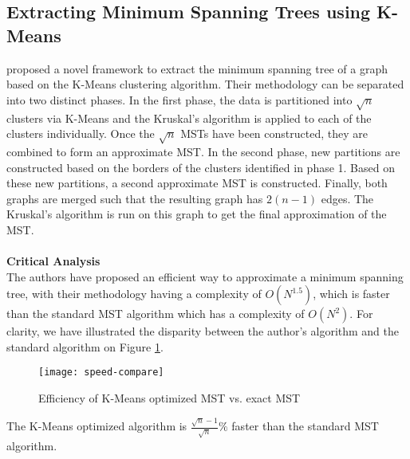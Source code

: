 \subsection{Extracting Minimum Spanning Trees using K-Means}
 proposed a novel framework to extract the minimum spanning tree of a graph based on the K-Means clustering algorithm. Their methodology can be separated into two distinct phases. In the first phase,  the data is partitioned into $\sqrt{n}$ clusters via K-Means and the Kruskal's algorithm is applied to each of the clusters individually.  Once the $\sqrt{n}$ MSTs have been constructed, they are combined to form an approximate MST. In the second phase,  new partitions are constructed based on the borders of the clusters identified in phase 1.  Based on these new partitions, a second approximate MST is constructed.  Finally, both graphs are merged such that the resulting graph has $2(n-1)$ edges. The Kruskal's algorithm is run on this graph to get the final approximation of the MST.
\\\\\textbf{Critical Analysis}\\
The authors have proposed an efficient way to approximate a minimum spanning tree, with their methodology having a complexity of $O(N^{1.5})$, which is faster than the standard MST algorithm which has a complexity of $O(N^2)$. 
For clarity, we have illustrated the disparity between the author's algorithm and the standard algorithm on Figure \ref{fig:speed-compare}.
\begin{figure}[H]
\centering
\texttt{[image: speed-compare]} 
\caption{Efficiency of K-Means optimized MST vs.  exact MST}\label{fig:speed-compare}
\end{figure}
\noindent  The K-Means optimized algorithm is $\frac{\sqrt{n}-1}{\sqrt{n}}\%$  faster than the standard MST algorithm.


